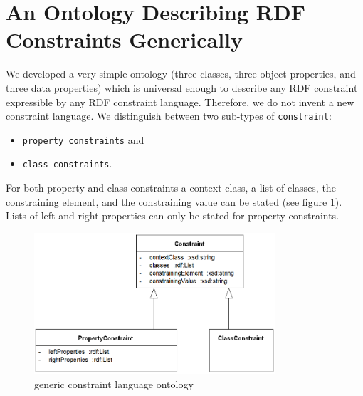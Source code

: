 \documentclass{llncs}
\newcommand{\ms}[1]{\texttt{#1}}
\begin{document}
\section{An Ontology Describing RDF Constraints Generically} 
\label{sec:ontology}

We developed a very simple ontology (three classes, three object properties, and three data properties) which is universal enough to describe any RDF constraint expressible by any RDF constraint language.
Therefore, we do not invent a new constraint language.
We distinguish between two sub-types of \ms{constraint}: 
\begin{itemize}
	\item \ms{property constraints} and 
	\item \ms{class constraints}. 
\end{itemize}

For both property and class constraints a context class, a list of classes, the constraining element, and the constraining value can be stated
(see figure \ref{fig:generic-constraint-language-ontology}). Lists of left and right properties can only be stated for property constraints.

\begin{figure}
	\centering
		\includegraphics[width=0.80\textwidth]{images/generic-constraint-language-ontology.png}
	\caption{generic constraint language ontology}
	\label{fig:generic-constraint-language-ontology}
\end{figure}
\end{document}
